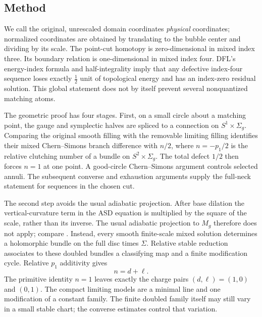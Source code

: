 \documentclass[11pt]{amsart}
\theoremstyle{definition}
\theoremstyle{remark}
\theoremstyle{plain}
\begin{document}
\subsection{Method}
We call the original, unrescaled domain coordinates \emph{physical}
coordinates; normalized coordinates are obtained by translating to
the bubble center and dividing by its scale.
The point-cut homotopy is zero-dimensional in mixed index three.  Its
boundary relation is one-dimensional in mixed index four.  DFL's
energy-index formula and half-integrality imply that any defective
index-four sequence loses exactly $\frac12$ unit of topological energy and
has an index-zero residual solution.  This global statement does not by
itself prevent several nonquantized matching atoms.

The geometric proof has four stages. First, on a small circle about a matching point,
the gauge and symplectic halves are spliced to a connection on
$S^1\times\Sigma_g$.  Comparing the original smooth filling with the
removable limiting filling identifies their mixed Chern--Simons branch
difference with $n/2$, where $n=-p_1/2$ is the relative clutching
number of a bundle on $S^2\times\Sigma_g$. The total defect $1/2$ then forces
$n=1$ at one point.  A good-circle Chern--Simons argument controls selected annuli.
The subsequent converse and exhaustion arguments supply the full-neck
statement for sequences in the chosen cut.

The second step avoids the usual adiabatic projection.  After
base dilation the vertical-curvature term in the ASD equation is
multiplied by the square of the scale, rather than its inverse.  The usual
adiabatic projection to $M_g$ therefore does not apply; compare
\cite{DosSal94,DosSal07}.  Instead, every smooth finite-scale mixed
solution determines a holomorphic bundle on the full disc times $\Sigma$.
Relative stable reduction associates to these doubled bundles a classifying
map and a finite modification cycle.  Relative $p_1$ additivity gives
\[
                            n=d+\ell.
\]
The primitive identity $n=1$ leaves exactly the charge pairs
$(d,\ell)=(1,0)$ and $(0,1)$. The compact limiting models are
a minimal line and one modification of a constant family.
The finite doubled family itself may still vary in a small
stable chart; the converse estimates control that variation.
\end{document}
